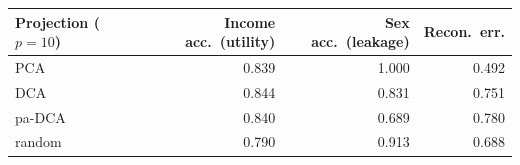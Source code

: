 \begin{tabular}{lrrr}
\toprule
Projection ($p{=}10$) & Income acc.\ (utility) & Sex acc.\ (leakage) & Recon.\ err. \\
\midrule
PCA & 0.839 & 1.000 & 0.492 \\
DCA & 0.844 & 0.831 & 0.751 \\
pa-DCA & 0.840 & 0.689 & 0.780 \\
random & 0.790 & 0.913 & 0.688 \\
\bottomrule
\end{tabular}
